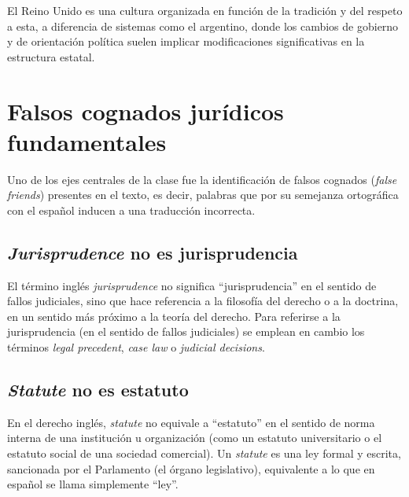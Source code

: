 \documentclass[12pt,oneside]{book}
\begin{document}
\begin{note}
El Reino Unido es una cultura organizada en función de la tradición y del respeto a esta, a diferencia de sistemas como el argentino, donde los cambios de gobierno y de orientación política suelen implicar modificaciones significativas en la estructura estatal.
\end{note}

\chapter{Falsos cognados jurídicos fundamentales}

Uno de los ejes centrales de la clase fue la identificación de falsos cognados (\emph{false friends}) presentes en el texto, es decir, palabras que por su semejanza ortográfica con el español inducen a una traducción incorrecta.

\section{\emph{Jurisprudence} no es jurisprudencia}

\begin{important}
El término inglés \emph{jurisprudence} no significa ``jurisprudencia'' en el sentido de fallos judiciales, sino que hace referencia a la filosofía del derecho o a la doctrina, en un sentido más próximo a la teoría del derecho. Para referirse a la jurisprudencia (en el sentido de fallos judiciales) se emplean en cambio los términos \emph{legal precedent}, \emph{case law} o \emph{judicial decisions}.
\end{important}

\section{\emph{Statute} no es estatuto}

\begin{important}
En el derecho inglés, \emph{statute} no equivale a ``estatuto'' en el sentido de norma interna de una institución u organización (como un estatuto universitario o el estatuto social de una sociedad comercial). Un \emph{statute} es una ley formal y escrita, sancionada por el Parlamento (el órgano legislativo), equivalente a lo que en español se llama simplemente ``ley''.
\end{important}
\end{document}
